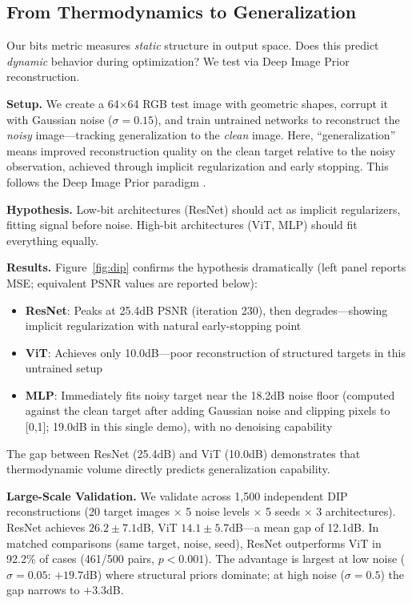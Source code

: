 \documentclass{article}
\begin{document}
\subsection{From Thermodynamics to Generalization}
\label{sec:dip}

Our bits metric measures \emph{static} structure in output space. Does this predict \emph{dynamic} behavior during optimization? We test via Deep Image Prior \cite{ulyanov2018deep} reconstruction.

\textbf{Setup.} We create a 64$\times$64 RGB test image with geometric shapes, corrupt it with Gaussian noise ($\sigma=0.15$), and train untrained networks to reconstruct the \emph{noisy} image---tracking generalization to the \emph{clean} image. Here, ``generalization'' means improved reconstruction quality on the clean target relative to the noisy observation, achieved through implicit regularization and early stopping. This follows the Deep Image Prior paradigm \cite{ulyanov2018deep}.

\textbf{Hypothesis.} Low-bit architectures (ResNet) should act as implicit regularizers, fitting signal before noise. High-bit architectures (ViT, MLP) should fit everything equally.

\textbf{Results.} Figure~\ref{fig:dip} confirms the hypothesis dramatically (left panel reports MSE; equivalent PSNR values are reported below):
\begin{itemize}
    \item \textbf{ResNet}: Peaks at 25.4dB PSNR (iteration 230), then degrades---showing implicit regularization with natural early-stopping point
    \item \textbf{ViT}: Achieves only 10.0dB---poor reconstruction of structured targets in this untrained setup
    \item \textbf{MLP}: Immediately fits noisy target near the 18.2dB noise floor (computed against the clean target after adding Gaussian noise and clipping pixels to [0,1]; 19.0dB in this single demo), with no denoising capability
\end{itemize}

The gap between ResNet (25.4dB) and ViT (10.0dB) demonstrates that thermodynamic volume directly predicts generalization capability.

\textbf{Large-Scale Validation.} We validate across 1,500 independent DIP reconstructions (20 target images $\times$ 5 noise levels $\times$ 5 seeds $\times$ 3 architectures). ResNet achieves $26.2 \pm 7.1$dB, ViT $14.1 \pm 5.7$dB---a mean gap of 12.1dB. In matched comparisons (same target, noise, seed), ResNet outperforms ViT in 92.2\% of cases (461/500 pairs, $p < 0.001$). The advantage is largest at low noise ($\sigma=0.05$: $+19.7$dB) where structural priors dominate; at high noise ($\sigma=0.5$) the gap narrows to $+3.3$dB.
\end{document}

